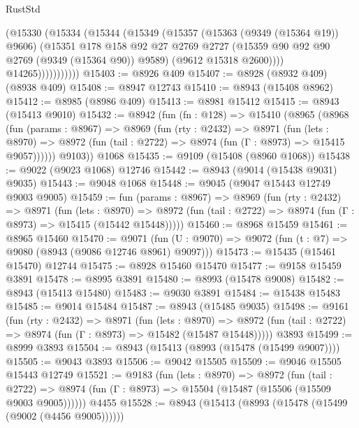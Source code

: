 \begin{lexlean}{RustStd}
\begin{coremodule}
                    (@15330
                      (@15334
                        (@15344
                          (@15349
                            (@15357
                              (@15363 (@9349 (@15364 @19)) @9606)
                              (@15351
                                @178
                                @158
                                @92
                                @27
                                @2769
                                @2727
                                (@15359 @90 @92 @90 @2769 (@9349 (@15364 @90)) @9589)
                                (@9612 @15318 @2600))))
                          @14265)))))))))))
@15403 := @8926 @409
@15407 := @8928 (@8932 @409) (@8938 @409)
@15408 := @8947 @12743
@15410 := @8943 (@15408 @8962)
@15412 := @8985 (@8986 @409)
@15413 := @8981 @15412
@15415 := @8943 (@15413 @9010)
@15432 := @8942
    (fun (fn : @128) =>
    @15410
      (@8965
        (@8968
          (fun (params : @8967) =>
          @8969
            (fun (rty : @2432) =>
            @8971
              (fun (lets : @8970) =>
              @8972 (fun (tail : @2722) => @8974 (fun (Γ : @8973) => @15415 @9057))))))
        @9103))
    @1068
@15435 := @9109 (@15408 (@8960 @1068))
@15438 := @9022 (@9023 @1068) @12746
@15442 := @8943 (@9014 (@15438 @9031) @9035)
@15443 := @9048 @1068
@15448 := @9045 (@9047 @15443 @12749 @9003 @9005)
@15459 := fun (params : @8967) =>
  @8969
    (fun (rty : @2432) =>
    @8971
      (fun (lets : @8970) =>
      @8972 (fun (tail : @2722) => @8974 (fun (Γ : @8973) => @15415 (@15442 @15448)))))
@15460 := @8968 @15459
@15461 := @8965 @15460
@15470 := @9071
    (fun (U : @9070) => @9072 (fun (t : @7) => @9080 (@8943 (@9086 @12746 @8961) @9097)))
@15473 := @15435 (@15461 @15470) @12744
@15475 := @8928 @15460 @15470
@15477 := @9158 @15459 @3891
@15478 := @8995 @3891
@15480 := @8993 (@15478 @9008)
@15482 := @8943 (@15413 @15480)
@15483 := @9030 @3891
@15484 := @15438 @15483
@15485 := @9014 @15484
@15487 := @8943 (@15485 @9035)
@15498 := @9161
    (fun (rty : @2432) =>
    @8971
      (fun (lets : @8970) =>
      @8972 (fun (tail : @2722) => @8974 (fun (Γ : @8973) => @15482 (@15487 @15448)))))
    @3893
@15499 := @8999 @3893
@15504 := @8943 (@15413 (@8993 (@15478 (@15499 @9007))))
@15505 := @9043 @3893
@15506 := @9042 @15505
@15509 := @9046 @15505 @15443 @12749
@15521 := @9183
    (fun (lets : @8970) =>
    @8972
      (fun (tail : @2722) =>
      @8974 (fun (Γ : @8973) => @15504 (@15487 (@15506 (@15509 @9003 @9005))))))
    @4455
@15528 := @8943 (@15413 (@8993 (@15478 (@15499 (@9002 (@4456 @9005))))))

\end{coremodule}
\end{lexlean}
